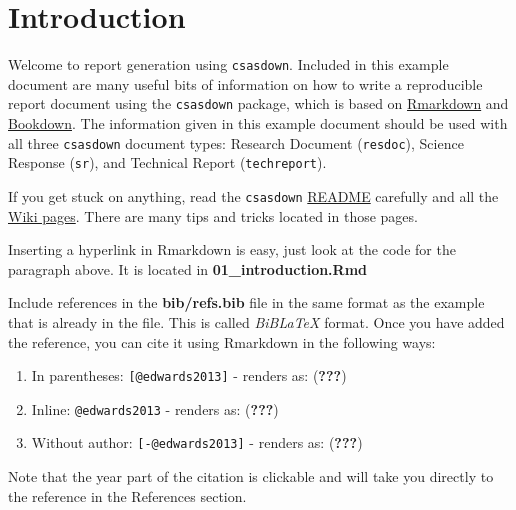 \documentclass[12pt]{article}\usepackage[]{graphicx}\usepackage[]{color}
\begin{document}

\frontmatter


\renewcommand{\headrulewidth}{0.5pt}  %
\renewcommand{\footrulewidth}{0.5pt}  %


\section{Introduction}\label{sec:introduction}

Welcome to report generation using \texttt{csasdown}. Included in this example document are many useful bits of information on how to write a reproducible report document using the \texttt{csasdown} package, which is based on \href{https://rmarkdown.rstudio.com/}{Rmarkdown} and \href{https://bookdown.org/}{Bookdown}. The information given in this example document should be used with all three \texttt{csasdown} document types: Research Document (\texttt{resdoc}), Science Response (\texttt{sr}), and Technical Report (\texttt{techreport}).

If you get stuck on anything, read the \texttt{csasdown} \href{https://github.com/pbs-assess/csasdown/blob/master/README.md}{README} carefully and all the \href{https://github.com/pbs-assess/csasdown/wiki}{Wiki pages}. There are many tips and tricks located in those pages.

Inserting a hyperlink in Rmarkdown is easy, just look at the code for the paragraph above. It is located in \textbf{01\_introduction.Rmd}

Include references in the \textbf{bib/refs.bib} file in the same format as the example that is already in the file. This is called \emph{BiBLaTeX} format. Once you have added the reference, you can cite it using Rmarkdown in the following ways:
\begin{enumerate}
\def\labelenumi{\arabic{enumi}.}

\item
  In parentheses: \texttt{{[}@edwards2013{]}} - renders as: ({\textbf{???}})
\item
  Inline: \texttt{@edwards2013} - renders as: ({\textbf{???}})
\item
  Without author: \texttt{{[}-@edwards2013{]}} - renders as: ({\textbf{???}})
\end{enumerate}
Note that the year part of the citation is clickable and will take you directly to the reference in the References section.
\end{document}
